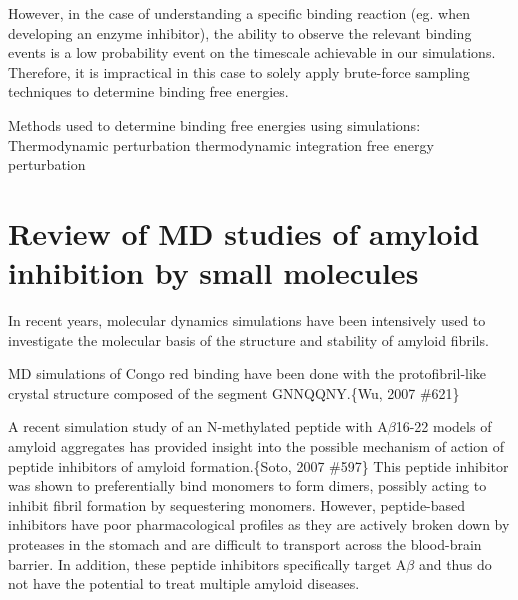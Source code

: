 \begin{outline}
	\1 However, in the case of understanding a specific binding reaction (eg. when developing an enzyme inhibitor), the ability to observe the relevant binding events is a low probability event on the timescale achievable in our simulations. Therefore, it is  impractical in this case to solely apply brute-force sampling techniques to determine binding free energies.

	  \2 Methods used to determine binding free energies using simulations:
	  	\3 Thermodynamic perturbation \cite{Gilson:2007hz}
			\4 thermodynamic integration
			\4 free energy perturbation
\end{outline}

\section{Review of MD studies of amyloid inhibition by small molecules}

\begin{outline}
	\1 In recent years, molecular dynamics simulations have been intensively used to investigate the molecular basis of the structure and stability of amyloid fibrils. 
	
	\1 MD simulations of Congo red binding have been done with the protofibril-like crystal structure composed of the segment GNNQQNY.\{Wu, 2007 \#621\}
	
	\1 A recent simulation study of an N-methylated peptide with A$\beta$16-22 models of amyloid aggregates has provided insight into the possible mechanism of action of peptide inhibitors of amyloid formation.\{Soto, 2007 \#597\} This peptide inhibitor was shown to preferentially bind monomers to form dimers, possibly acting to inhibit fibril formation by sequestering monomers. However, peptide-based inhibitors have poor pharmacological profiles as they are actively broken down by proteases in the stomach and are difficult to transport across the blood-brain barrier. In addition, these peptide inhibitors specifically target A$\beta$ and thus do not have the potential to treat multiple amyloid diseases.
\end{outline}


